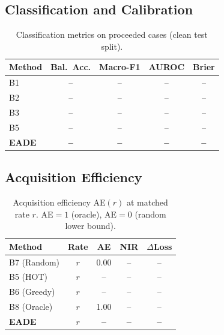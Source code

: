 \documentclass[conference]{IEEEtran}
\newcommand{\1}{\mathbf{1}}
\begin{document}
\subsection{Classification and Calibration}

\begin{table}[H]
  \centering
  \caption{Classification metrics on proceeded cases (clean test split).}
  \label{tab:classification}
  \renewcommand{\arraystretch}{1.2}
  \small
  \begin{tabular}{lcccc}
    \toprule
    \textbf{Method}
      & \textbf{Bal.~Acc.}
      & \textbf{Macro-F1}
      & \textbf{AUROC}
      & \textbf{Brier} \\
    \midrule
    B1 & -- & -- & -- & -- \\
    B2 & -- & -- & -- & -- \\
    B3 & -- & -- & -- & -- \\
    B5 & -- & -- & -- & -- \\
    \rowcolor{bestrow}
    \textbf{EADE} & \textbf{--} & \textbf{--} & \textbf{--} & \textbf{--} \\
    \bottomrule
  \end{tabular}
\end{table}

\subsection{Acquisition Efficiency}

\begin{table}[H]
  \centering
  \caption{%
    Acquisition efficiency AE$(r)$ at matched rate $r$.
    AE$=1$ (oracle), AE$=0$ (random lower bound).
  }
  \label{tab:acquisition}
  \renewcommand{\arraystretch}{1.2}
  \small
  \begin{tabular}{lcccc}
    \toprule
    \textbf{Method} & \textbf{Rate} & \textbf{AE} & \textbf{NIR} & \textbf{$\Delta$Loss} \\
    \midrule
    B7 (Random) & $r$ & 0.00 & -- & -- \\
    B5 (HOT)    & $r$ & --   & -- & -- \\
    B6 (Greedy) & $r$ & --   & -- & -- \\
    B8 (Oracle) & $r$ & 1.00 & -- & -- \\
    \rowcolor{bestrow}
    \textbf{EADE} & $r$ & \textbf{--} & \textbf{--} & \textbf{--} \\
    \bottomrule
  \end{tabular}
\end{table}
\end{document}
